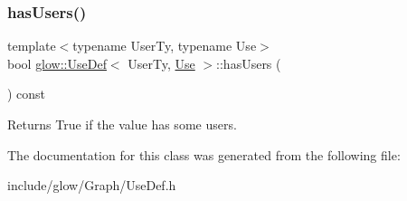 \subsubsection{\texorpdfstring{has\+Users()}{hasUsers()}}
{\footnotesize\ttfamily template$<$typename User\+Ty, typename Use$>$ \\
bool \hyperlink{classglow_1_1_use_def}{glow\+::\+Use\+Def}$<$ User\+Ty, \hyperlink{structglow_1_1_use}{Use} $>$\+::has\+Users (\begin{DoxyParamCaption}{ }\end{DoxyParamCaption}) const\hspace{0.3cm}{\ttfamily [inline]}}

\begin{DoxyReturn}{Returns}
True if the value has some users. 
\end{DoxyReturn}


The documentation for this class was generated from the following file\+:\begin{DoxyCompactItemize}
\item 
include/glow/\+Graph/Use\+Def.\+h\end{DoxyCompactItemize}
